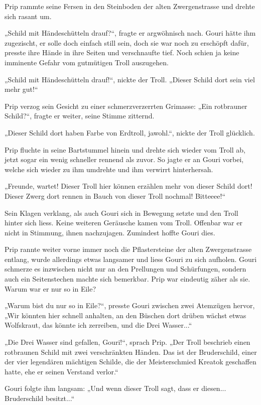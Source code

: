\documentclass[10pt, a4paper, oneside]{book}
\begin{document}
Prip rammte seine Fersen in den Steinboden der alten Zwergenstrasse und drehte sich rasant um.

„Schild mit Händeschütteln drauf?“, fragte er argwöhnisch nach. Gouri hätte ihm zugezischt, er solle doch einfach still sein, doch sie war noch zu erschöpft dafür, presste ihre Hände in ihre Seiten und verschnaufte tief. Noch schien ja keine imminente Gefahr vom gutmütigen Troll auszugehen.

„Schild mit Händeschütteln drauf!“, nickte der Troll. „Dieser Schild dort sein viel mehr gut!“

Prip verzog sein Gesicht zu einer schmerzverzerrten Grimasse: „Ein rotbrauner Schild?“, fragte er weiter, seine Stimme zitternd.

„Dieser Schild dort haben Farbe von Erdtroll, jawohl.“, nickte der Troll glücklich.

Prip fluchte in seine Bartstummel hinein und drehte sich wieder vom Troll ab, jetzt sogar ein wenig schneller rennend als zuvor. So jagte er an Gouri vorbei, welche sich wieder zu ihm umdrehte und ihm verwirrt hinterhersah.

„Freunde, wartet! Dieser Troll hier können erzählen mehr von dieser Schild dort! Dieser Zwerg dort rennen in Bauch von dieser Troll nochmal! Bitteeee!“

Sein Klagen verklang, als auch Gouri sich in Bewegung setzte und den Troll hinter sich liess. Keine weiteren Geräusche kamen vom Troll. Offenbar war er nicht in Stimmung, ihnen nachzujagen. Zumindest hoffte Gouri dies.

Prip rannte weiter vorne immer noch die Pflastersteine der alten Zwergenstrasse entlang, wurde allerdings etwas langsamer und liess Gouri zu sich aufholen. Gouri schmerze es inzwischen nicht nur an den Prellungen und Schürfungen, sondern auch ein Seitenstechen machte sich bemerkbar. Prip war eindeutig zäher als sie. Warum war er nur so in Eile?

„Warum bist du nur so in Eile?“, presste Gouri zwischen zwei Atemzügen hervor, „Wir könnten hier schnell anhalten, an den Büschen dort drüben wächst etwas Wolfskraut, das könnte ich zerreiben, und die Drei Wasser...“

„Die Drei Wasser sind gefallen, Gouri!“, sprach Prip. „Der Troll beschrieb einen rotbraunen Schild mit zwei verschränkten Händen. Das ist der Bruderschild, einer der vier legendären mächtigen Schilde, die der Meisterschmied Kreatok geschaffen hatte, ehe er seinen Verstand verlor.“

Gouri folgte ihm langsam: „Und wenn dieser Troll sagt, dass er diesen... Bruderschild besitzt...“
\end{document}
